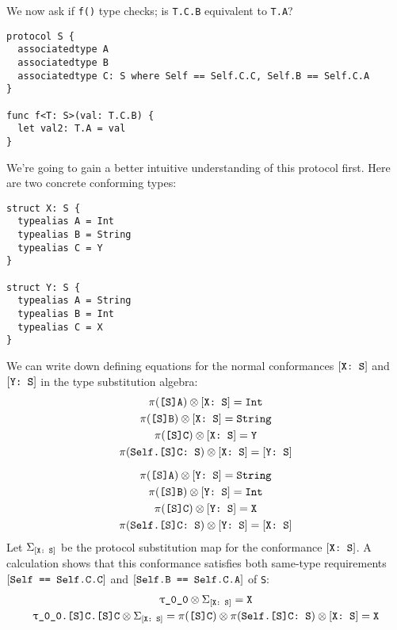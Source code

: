 \documentclass[../generics]{subfiles}
\begin{document}
\begin{example}\label{proto assoc rule}
We now ask if \texttt{f()} type checks; is \texttt{T.C.B} equivalent to \texttt{T.A}?
\begin{Verbatim}
protocol S {
  associatedtype A
  associatedtype B
  associatedtype C: S where Self == Self.C.C, Self.B == Self.C.A
}

func f<T: S>(val: T.C.B) {
  let val2: T.A = val
}
\end{Verbatim}
We're going to gain a better intuitive understanding of this protocol first. Here are two concrete conforming types:
\begin{Verbatim}
struct X: S {
  typealias A = Int
  typealias B = String
  typealias C = Y
}

struct Y: S {
  typealias A = String
  typealias B = Int
  typealias C = X
}
\end{Verbatim}
We can write down defining equations for the normal conformances $[\texttt{X:~S}]$ and $[\texttt{Y:~S}]$ in the type substitution algebra:
\begin{gather*}
\pi(\texttt{[S]A}) \otimes [\texttt{X:~S}] = \texttt{Int}\\
\pi(\texttt{[S]B}) \otimes [\texttt{X:~S}] = \texttt{String}\\
\pi(\texttt{[S]C}) \otimes [\texttt{X:~S}] = \texttt{Y}\\
\pi(\texttt{Self.[S]C:~S}) \otimes [\texttt{X:~S}] = [\texttt{Y:~S}]\\[\medskipamount]
\pi(\texttt{[S]A}) \otimes [\texttt{Y:~S}] = \texttt{String}\\
\pi(\texttt{[S]B}) \otimes [\texttt{Y:~S}] = \texttt{Int}\\
\pi(\texttt{[S]C}) \otimes [\texttt{Y:~S}] = \texttt{X}\\
\pi(\texttt{Self.[S]C:~S}) \otimes [\texttt{Y:~S}] = [\texttt{X:~S}]
\end{gather*}
Let $\Sigma_{[\texttt{X:~S}]}$ be the protocol substitution map for the conformance $[\texttt{X:~S}]$. A calculation shows that this conformance satisfies both same-type requirements $[\texttt{Self == Self.C.C}]$ and $[\texttt{Self.B == Self.C.A}]$ of \texttt{S}:
\begin{gather*}
\ttgp{0}{0}\otimes\Sigma_{\ConfReq{X}{S}}=\texttt{X}\\
\texttt{\ttgp{0}{0}.[S]C.[S]C}\otimes\Sigma_{\ConfReq{X}{S}}=\AssocType{[S]C}\otimes\AssocConf{Self.[S]C}{S}\otimes\ConfReq{X}{S}=\texttt{X}\\[\medskipamount]

\end{gather*}
\end{example}
\end{document}
